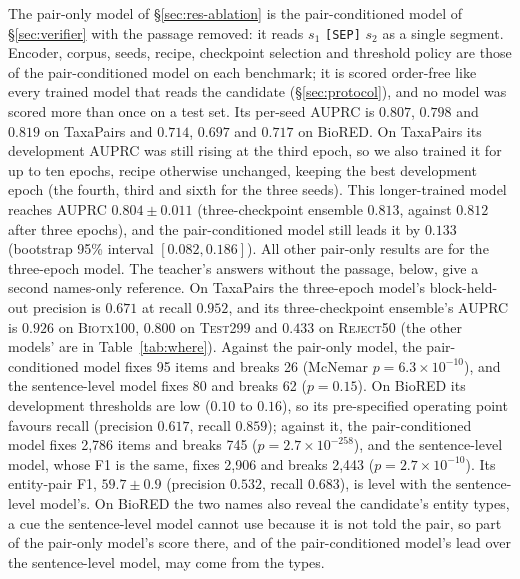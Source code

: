 \documentclass[11pt]{article}
\newcommand{\bench}{\mbox{TaxaPairs}}
\begin{document}
The pair-only model of \S\ref{sec:res-ablation} is the pair-conditioned model of
\S\ref{sec:verifier} with the passage removed: it reads $s_1$ \texttt{[SEP]} $s_2$ as a single
segment. Encoder, corpus, seeds, recipe, checkpoint selection and threshold policy are those of the
pair-conditioned model on each benchmark; it is scored order-free like every trained model that reads the
candidate (\S\ref{sec:protocol}), and no model was scored more than once on a test set. Its per-seed
AUPRC is $0.807$, $0.798$ and $0.819$ on \bench{} and $0.714$, $0.697$ and $0.717$ on BioRED\@. On
\bench{} its development AUPRC was still rising at the third epoch, so we also trained it for up to
ten epochs, recipe otherwise unchanged, keeping the best development epoch (the fourth, third and
sixth for the three seeds). This longer-trained model reaches AUPRC $0.804 \pm 0.011$
(three-checkpoint ensemble $0.813$, against $0.812$ after three epochs), and the pair-conditioned
model still leads it by $0.133$ (bootstrap 95\% interval $[0.082, 0.186]$). All other pair-only
results are for the three-epoch model. The teacher's answers without the passage, below, give a
second names-only reference. On \bench{} the three-epoch model's block-held-out precision is $0.671$ at recall $0.952$, and its three-checkpoint
ensemble's AUPRC is $0.926$ on \textsc{Biotx100}, $0.800$ on \textsc{Test299} and $0.433$ on
\textsc{Reject50} (the other models' are in Table~\ref{tab:where}). Against the pair-only model, the
pair-conditioned model fixes 95 items and breaks 26 (McNemar $p = 6.3\times10^{-10}$), and the
sentence-level model fixes 80 and breaks 62 ($p = 0.15$). On BioRED its development thresholds are
low ($0.10$ to $0.16$), so its pre-specified operating point favours recall (precision $0.617$,
recall $0.859$); against it, the pair-conditioned model fixes 2{,}786 items and breaks 745
($p = 2.7\times10^{-258}$), and the sentence-level model, whose F1 is the same, fixes 2{,}906 and
breaks 2{,}443 ($p = 2.7\times10^{-10}$). Its entity-pair F1, $59.7 \pm 0.9$ (precision $0.532$,
recall $0.683$), is level with the sentence-level model's. On BioRED the two names also reveal the
candidate's entity types, a cue the sentence-level model cannot use because it is not told the pair,
so part of the pair-only model's score there, and of the pair-conditioned model's lead over the
sentence-level model, may come from the types.
\end{document}
